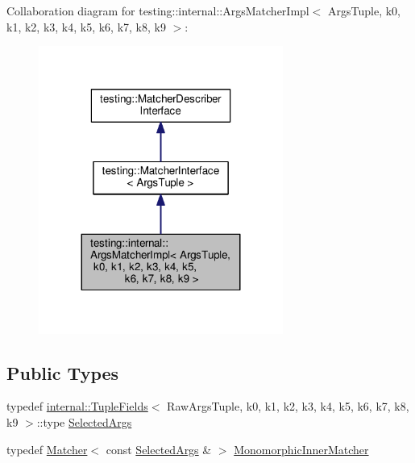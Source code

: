 Collaboration diagram for testing\+:\+:internal\+:\+:Args\+Matcher\+Impl$<$ Args\+Tuple, k0, k1, k2, k3, k4, k5, k6, k7, k8, k9 $>$\+:
\nopagebreak
\begin{figure}[H]
\begin{center}
\leavevmode
\includegraphics[width=227pt]{classtesting_1_1internal_1_1ArgsMatcherImpl__coll__graph}
\end{center}
\end{figure}
\subsection*{Public Types}
\begin{DoxyCompactItemize}
\item 
typedef \hyperlink{classtesting_1_1internal_1_1TupleFields}{internal\+::\+Tuple\+Fields}$<$ Raw\+Args\+Tuple, k0, k1, k2, k3, k4, k5, k6, k7, k8, k9 $>$\+::type \hyperlink{classtesting_1_1internal_1_1ArgsMatcherImpl_ab061679f6251e56ccbedaf0c316d00ff}{Selected\+Args}
\item 
typedef \hyperlink{classtesting_1_1Matcher}{Matcher}$<$ const \hyperlink{classtesting_1_1internal_1_1ArgsMatcherImpl_ab061679f6251e56ccbedaf0c316d00ff}{Selected\+Args} \& $>$ \hyperlink{classtesting_1_1internal_1_1ArgsMatcherImpl_ab90d2c074b2072d6c39bf26209fb941f}{Monomorphic\+Inner\+Matcher}
\end{DoxyCompactItemize}
